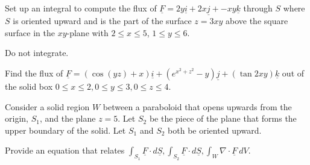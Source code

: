 \documentclass[12pt,letterpaper,noanswers]{exam}
\newcommand{\mb}[1]{\underline{#1}}
\begin{document}
 \pdfpageheight 11in 
  \pdfpagewidth 8.5in



\begin{questions}
\question Set up an integral to compute the flux of $\mb F = 2y\mb i + 2x\mb j + -xy\mb k$ through $S$ where $S$ is oriented upward and is the part of the surface $z = 3xy$ above the square surface in the $xy$-plane with $2\leq x \leq 5$, $1\leq y \leq 6$.

Do not integrate.

\vfill

\item 
Find the flux of $\underline F = (\cos(yz) + x)\mb i + (e^{x^2+z^2}-y)\mb j + (\tan{2xy})\mb k$ out of the solid box $0\leq x \leq 2, 0\leq y \leq 3, 0\leq z \leq 4$.

\vfill

\question Consider a solid region $W$ between a paraboloid that opens upwards from the origin, $S_1$, and the plane $z = 5$.  Let $S_2$ be the piece of the plane that forms the upper boundary of the solid.  Let $S_1$ and $S_2$ both be oriented upward.

Provide an equation that relates $\displaystyle\int_{S_1}\mb F\cdot d\mb S,\int_{S_2}\mb F\cdot d\mb S,\int_{W}\nabla \cdot \mb F\ dV$.

\vfill

\end{questions}
\end{document}

